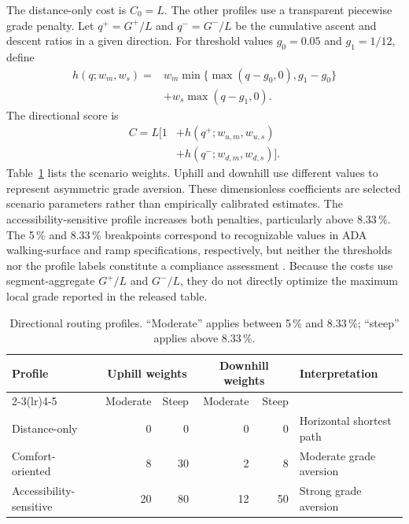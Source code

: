 \documentclass[twocolumn,10pt]{article}
\newcommand{\pct}{\,\%\xspace}
\begin{document}
The distance-only cost is \(C_0=L\). The other profiles use a transparent piecewise grade penalty. Let \(q^+=G^+/L\) and \(q^-=G^-/L\) be the cumulative ascent and descent ratios in a given direction. For threshold values \(g_0=0.05\) and \(g_1=1/12\), define
\begin{equation}
  \begin{aligned}
    h(q;w_m,w_s)={} & w_m\min\{\max(q-g_0,0),g_1-g_0\} \\
                    & +w_s\max(q-g_1,0).
  \end{aligned}
  \label{eq:penalty}
\end{equation}
The directional score is
\begin{equation}
  \begin{aligned}
    C=L\big[1&+h(q^+;w_{u,m},w_{u,s}) \\
         &+h(q^-;w_{d,m},w_{d,s})\big].
  \end{aligned}
  \label{eq:cost}
\end{equation}
Table~\ref{tab:profiles} lists the scenario weights. Uphill and downhill use different values to represent asymmetric grade aversion. These dimensionless coefficients are selected scenario parameters rather than empirically calibrated estimates. The accessibility-sensitive profile increases both penalties, particularly above 8.33\pct. The 5\pct and 8.33\pct breakpoints correspond to recognizable values in ADA walking-surface and ramp specifications, respectively, but neither the thresholds nor the profile labels constitute a compliance assessment \citep{usaccessboard2010ada}. Because the costs use segment-aggregate \(G^+/L\) and \(G^-/L\), they do not directly optimize the maximum local grade reported in the released table.

\begin{table}[t]
  \centering
  \caption{Directional routing profiles. ``Moderate'' applies between 5\pct and 8.33\pct; ``steep'' applies above 8.33\pct.}
  \label{tab:profiles}
  \small
  \begin{tabular}{@{}lrrrrl@{}}
    \toprule
    Profile                 & \multicolumn{2}{c}{Uphill weights} & \multicolumn{2}{c}{Downhill weights} & Interpretation                                    \\
    \cmidrule(lr){2-3}\cmidrule(lr){4-5}
                            & Moderate                           & Steep                                & Moderate       & Steep &                          \\
    \midrule
    Distance-only           & 0                                  & 0                                    & 0              & 0     & Horizontal shortest path \\
    Comfort-oriented        & 8                                  & 30                                   & 2              & 8     & Moderate grade aversion  \\
    Accessibility-sensitive & 20                                 & 80                                   & 12             & 50    & Strong grade aversion    \\
    \bottomrule
  \end{tabular}
\end{table}
\end{document}
